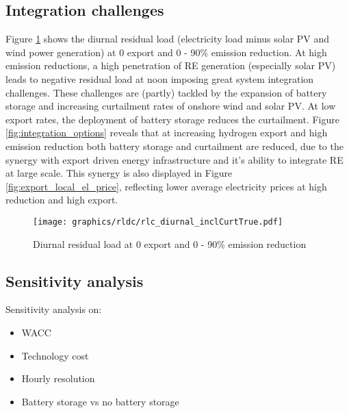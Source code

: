 \subsection{Integration challenges}
\label{subsec:integration_challenges}
Figure \ref{fig:diurnal} shows the diurnal residual load (electricity load minus solar PV and wind power generation) at 0 export and 0 - 90\% emission reduction. At high emission reductions, a high penetration of RE generation (especially solar PV) 
leads to negative residual load at noon imposing great system integration challenges.
These challenges are (partly) tackled by the expansion of battery storage and increasing curtailment rates of onshore wind and solar PV. At low export rates, the deployment of battery storage reduces the curtailment. Figure \ref{fig:integration_options}
reveals that at increasing hydrogen export and high emission reduction both battery storage and curtailment are reduced, due to the synergy with export driven energy infrastructure and it's ability to integrate RE at large scale.
This synergy is also displayed in Figure \ref{fig:export_local_el_price}, reflecting lower average electricity prices at high reduction and high export.

\begin{figure}[h!]
    \centering
    \texttt{[image: graphics/rldc/rlc\_diurnal\_inclCurtTrue.pdf]}
    \caption{Diurnal residual load at 0 export and 0 - 90\% emission reduction}
    \label{fig:diurnal}
\end{figure}

\subsection{Sensitivity analysis}
\label{subsec:sensitivity}
Sensitivity analysis on:
\begin{itemize}
    \item WACC
    \item Technology cost
    \item Hourly resolution
    \item Battery storage vs no battery storage
\end{itemize}


